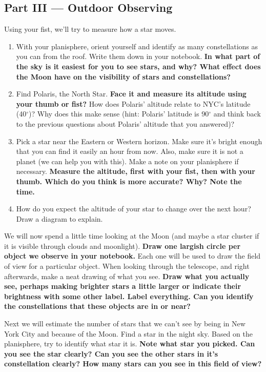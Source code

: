 \documentclass[11pt]{article}
\begin{document}
\subsection{Part III --- Outdoor Observing}

Using your fist, we'll try to measure how a star moves. 

\begin{enumerate}
    \item With your planisphere, orient yourself and identify as many constellations as you can from the roof.  Write them down in your notebook.  \textbf{In what part of the sky is it easiest for you to see stars, and why? What effect does the Moon have on the visibility of stars and constellations?}
    \item Find Polaris, the North Star. \textbf{Face it and measure its altitude using your thumb or fist?} How does Polaris' altitude relate to NYC's latitude (40$^{\circ}$)? Why does this make sense (hint: Polaris' latitude is 90$^{\circ}$ and think back to the previous questions about Polaris' altitude that you answered)?
    \item Pick a star near the Eastern or Western horizon.  Make sure it's bright enough that you can find it easily an hour from now. Also, make sure it is not a planet (we can help you with this). Make a note on your planisphere if necessary. \textbf{Measure the altitude, first with your fist, then with your thumb.  Which do you think is more accurate? Why? Note the time.}
    \item How do you expect the altitude of your star to change over the next hour? Draw a diagram to explain.
\end{enumerate}

\medskip \noindent
We will now spend a little time looking at the Moon (and maybe a star cluster if it is visible through clouds and moonlight).  \textbf{Draw one largish circle per object we observe in your notebook.}  Each one will be used to draw the field of view for a particular object. When looking through the telescope, and right afterwards, make a neat drawing of what you see. \textbf{Draw what you actually see, perhaps making brighter stars a little larger or indicate their brightness with some other label. Label everything. Can you identify the constellations that these objects are in or near?}

\medskip \noindent
Next we will estimate the number of stars that we can't see by being in New York City and because of the Moon.  Find a star in the night sky. Based on the planisphere, try to identify what star it is. \textbf{Note what star you picked. Can you see the star clearly? Can you see the other stars in it's constellation clearly? How many stars can you see in this field of view?}
\end{document}
